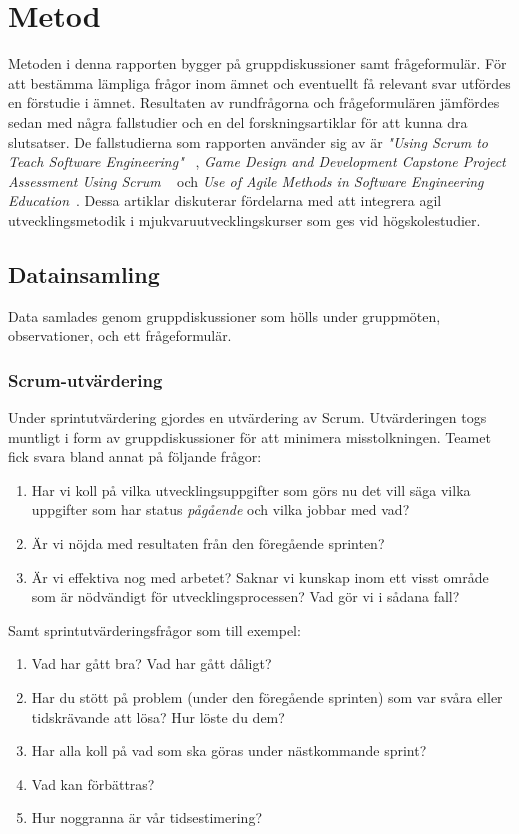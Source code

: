 \section{Metod} \label{sec:Lieth_Wahid-method}
Metoden i denna rapporten bygger på gruppdiskussioner samt frågeformulär. För att bestämma lämpliga frågor inom ämnet och eventuellt  få relevant svar utfördes en förstudie i ämnet. Resultaten av rundfrågorna och frågeformulären jämfördes sedan med några  fallstudier och en del forskningsartiklar för att kunna dra slutsatser. De fallstudierna som rapporten använder sig av är \textit{"Using Scrum to Teach Software Engineering"} ~\cite{Usingscr27:online}, \textit{ Game Design and Development Capstone Project Assessment Using Scrum} ~\cite{GameDesign} och \textit{Use of Agile Methods in Software Engineering Education}~\cite{UseofAgi59:online}. Dessa artiklar diskuterar fördelarna med att integrera agil utvecklingsmetodik i mjukvaruutvecklingskurser som ges vid högskolestudier.  
\subsection{Datainsamling}\label{ds}
Data samlades genom gruppdiskussioner som hölls under gruppmöten, observationer, och ett frågeformulär. 
\subsubsection {Scrum-utvärdering} \label{Lieth:scrumU}
Under sprintutvärdering gjordes en utvärdering av Scrum. Utvärderingen togs muntligt i form av gruppdiskussioner för att minimera misstolkningen. Teamet fick svara bland annat på följande frågor:
\begin{enumerate}
	\item Har vi koll på vilka utvecklingsuppgifter som görs nu det vill säga vilka uppgifter som har status \textit{pågående} och vilka jobbar med vad? 
	\item Är vi nöjda med resultaten från den föregående sprinten?
	\item Är vi effektiva nog med arbetet? Saknar vi kunskap inom ett visst område som är nödvändigt för utvecklingsprocessen? Vad gör vi i sådana fall? \label{f3}
\end{enumerate} 
Samt sprintutvärderingsfrågor som till exempel:
\begin{enumerate}
	\item Vad har gått bra? Vad har gått dåligt?
	\item Har du stött på problem (under den föregående sprinten) som var svåra eller tidskrävande att lösa? Hur löste du dem?
	\item Har alla koll på vad som ska göras under nästkommande sprint?
	\item Vad kan förbättras?
	\item Hur noggranna är vår tidsestimering?
\end{enumerate} 

